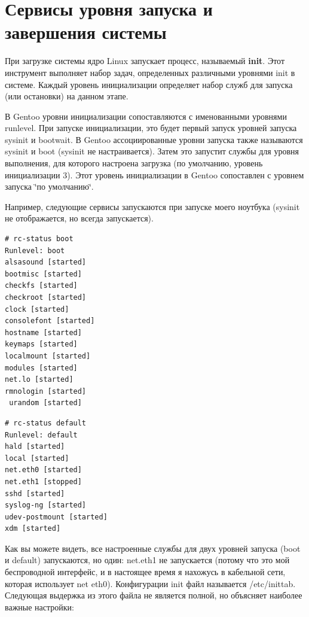 \documentclass[10pt]{book}
\begin{document}
\section{Сервисы уровня запуска и завершения системы}

При загрузке системы ядро Linux запускает процесс, называемый \textbf{init}.
Этот инструмент выполняет набор задач, определенных различными уровнями
init в системе. Каждый уровень инициализации определяет набор служб
для запуска (или остановки) на данном этапе.

В Gentoo уровни инициализации сопоставляются с именованными уровнями
runlevel. При запуске инициализации, это будет первый запуск уровней
запуска sysinit и bootwait. В Gentoo ассоциированные уровни запуска
также называются sysinit и boot (sysinit не настраивается). Затем
это запустит службы для уровня выполнения, для которого настроена
загрузка (по умолчанию, уровень инициализации 3). Этот уровень инициализации
в Gentoo сопоставлен с уровнем запуска \char`\"{}по умолчанию\char`\"{}.

Например, следующие сервисы запускаются при запуске моего ноутбука
(sysinit не отображается, но всегда запускается). \begin{tcolorbox}
\begin{lstlisting}
# rc-status boot
Runlevel: boot
alsasound [started]
bootmisc [started]
checkfs [started]
checkroot [started]
clock [started]
consolefont [started]
hostname [started]
keymaps [started]
localmount [started]
modules [started]
net.lo [started]
rmnologin [started]
 urandom [started]
\end{lstlisting}
\end{tcolorbox}

\begin{tcolorbox} 
\begin{lstlisting}
# rc-status default
Runlevel: default
hald [started]
local [started]
net.eth0 [started]
net.eth1 [stopped]
sshd [started]
syslog-ng [started]
udev-postmount [started]
xdm [started]
\end{lstlisting}
\end{tcolorbox}

Как вы можете видеть, все настроенные службы для двух уровней запуска
(boot и default) запускаются, но один: net.eth1 не запускается (потому
что это мой беспроводной интерфейс, и в настоящее время я нахожусь
в кабельной сети, которая использует net eth0). Конфигурации init
файл называется /etc/inittab. Следующая выдержка из этого файла не
является полной, но объясняет наиболее важные настройки:
\end{document}
